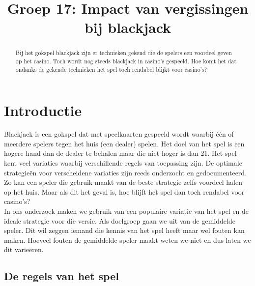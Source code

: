\documentclass[conference]{IEEEtran}
\begin{document}
\title{Groep 17: Impact van vergissingen bij blackjack}

\author{
\and
{}
\and
{}
}

\maketitle


\begin{abstract}
Bij het gokspel blackjack zijn er technieken gekend die de spelers een voordeel geven op het casino. Toch wordt nog steeds blackjack in casino's gespeeld. Hoe komt het dat ondanks de gekende technieken het spel toch rendabel blijkt voor casino's?
\end{abstract}

\IEEEpeerreviewmaketitle

\section{Introductie}
Blackjack is een gokspel dat met speelkaarten gespeeld wordt waarbij \'e\'en of meerdere spelers tegen het huis (een dealer) spelen. Het doel van het spel is een hogere hand dan de dealer te behalen maar die niet hoger is dan 21. Het spel kent veel variaties waarbij verschillende regels van toepassing zijn. De optimale strategie\"en voor verscheidene variaties zijn reeds onderzocht en gedocumenteerd. Zo kan een speler die gebruik maakt van de beste strategie zelfs voordeel halen op het huis. Maar als dit het geval is, hoe blijft het spel dan toch rendabel voor casino's?
\\In ons onderzoek maken we gebruik van een populaire variatie van het spel en de ideale strategie voor die versie. Als doelgroep gaan we uit van de gemiddelde speler. Dit wil zeggen iemand die kennis van het spel heeft maar wel fouten kan maken. Hoeveel fouten de gemiddelde speler maakt weten we niet en dus laten we dit varie\"eren.

\subsection{De regels van het spel}
\end{document}
